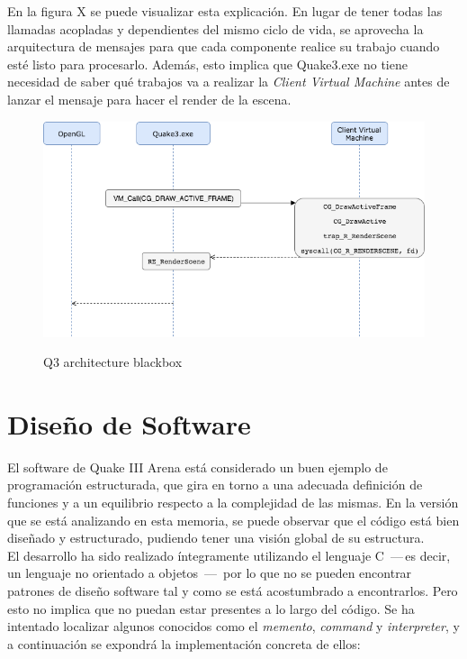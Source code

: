 \documentclass[a4paper,12pt]{report}
\begin{document}
    En la figura X se puede visualizar esta explicación. En lugar de tener todas las llamadas acopladas y dependientes del mismo ciclo de vida, se aprovecha la arquitectura de mensajes para que cada componente realice su trabajo cuando esté listo para procesarlo. Además, esto implica que Quake3.exe no tiene necesidad de saber qué trabajos va a realizar la \textit{Client Virtual Machine} antes de lanzar el mensaje para hacer el render de la escena.\\
    
    
    \begin{center}
    	\begin{figure}[h]
    		\includegraphics[width=1\textwidth]{images/diagrama}
    		\label{fig:diagrama}
    		\caption{Q3 architecture blackbox}
    	\end{figure}
    \end{center}
    

	
	
	\newpage
	\section{Diseño de Software}
	

	
	El software de Quake III Arena está considerado un buen ejemplo de programación estructurada, que gira en torno a una adecuada definición de funciones y a un equilibrio respecto a la complejidad de las mismas. En la versión que se está analizando en esta memoria, se puede observar que el código está bien diseñado y estructurado, pudiendo tener una visión global de su estructura.\\
	
	El desarrollo ha sido realizado íntegramente utilizando el lenguaje C \,---\,es decir, un lenguaje no orientado a objetos \,---\, por lo que no se pueden encontrar patrones de diseño software tal y como se está acostumbrado a encontrarlos. Pero esto no implica que no puedan estar presentes a lo largo del código. Se ha intentado localizar algunos conocidos como el \textit{memento}, \textit{command} y \textit{interpreter}, y a continuación se expondrá la implementación concreta de ellos:\\
	
\end{document}
